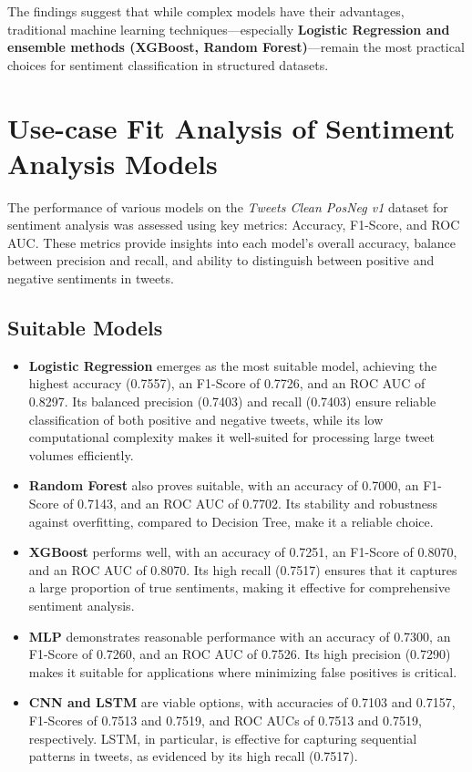 The findings suggest that while complex models have their advantages, traditional machine learning techniques—especially \textbf{Logistic Regression and ensemble methods (XGBoost, Random Forest)}—remain the most practical choices for sentiment classification in structured datasets.

\section{Use-case Fit Analysis of Sentiment Analysis Models}

The performance of various models on the \textit{Tweets Clean PosNeg v1} dataset for sentiment analysis was assessed using key metrics: Accuracy, F1-Score, and ROC AUC. These metrics provide insights into each model's overall accuracy, balance between precision and recall, and ability to distinguish between positive and negative sentiments in tweets.

\subsection{Suitable Models}

\begin{itemize}
    \item \textbf{Logistic Regression} emerges as the most suitable model, achieving the highest accuracy (0.7557), an F1-Score of 0.7726, and an ROC AUC of 0.8297. Its balanced precision (0.7403) and recall (0.7403) ensure reliable classification of both positive and negative tweets, while its low computational complexity makes it well-suited for processing large tweet volumes efficiently.
    \item \textbf{Random Forest} also proves suitable, with an accuracy of 0.7000, an F1-Score of 0.7143, and an ROC AUC of 0.7702. Its stability and robustness against overfitting, compared to Decision Tree, make it a reliable choice.
    \item \textbf{XGBoost} performs well, with an accuracy of 0.7251, an F1-Score of 0.8070, and an ROC AUC of 0.8070. Its high recall (0.7517) ensures that it captures a large proportion of true sentiments, making it effective for comprehensive sentiment analysis.
    \item \textbf{MLP} demonstrates reasonable performance with an accuracy of 0.7300, an F1-Score of 0.7260, and an ROC AUC of 0.7526. Its high precision (0.7290) makes it suitable for applications where minimizing false positives is critical.
    \item \textbf{CNN and LSTM} are viable options, with accuracies of 0.7103 and 0.7157, F1-Scores of 0.7513 and 0.7519, and ROC AUCs of 0.7513 and 0.7519, respectively. LSTM, in particular, is effective for capturing sequential patterns in tweets, as evidenced by its high recall (0.7517).
\end{itemize}

